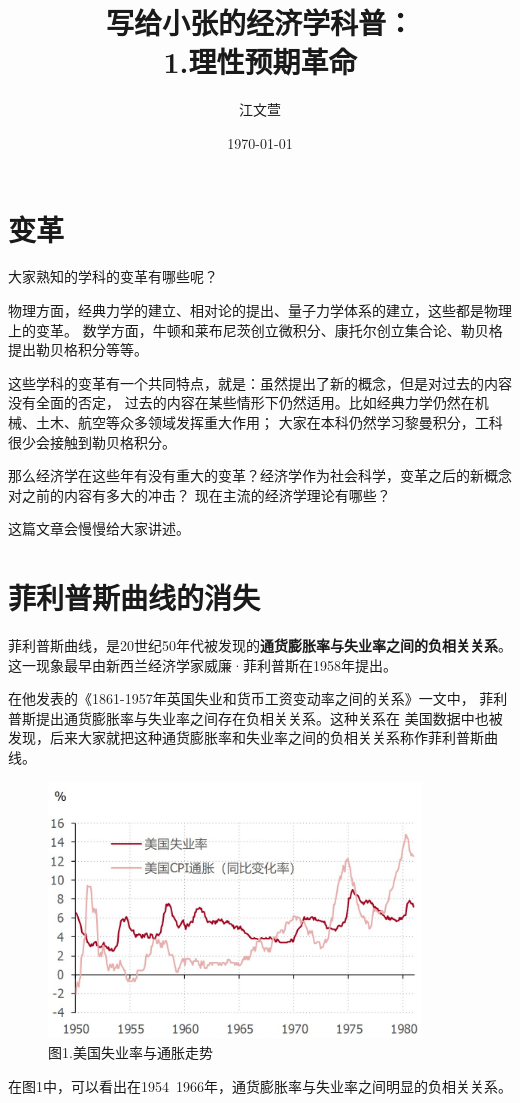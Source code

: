 \documentclass[UTF8]{ctexart}
\title{写给小张的经济学科普： \\ 1.理性预期革命}
\author{江文萱}
\date{\today}
\begin{document}
\maketitle

\section{变革}
    大家熟知的学科的变革有哪些呢？\par
    物理方面，经典力学的建立、相对论的提出、量子力学体系的建立，这些都是物理上的变革。
    数学方面，牛顿和莱布尼茨创立微积分、康托尔创立集合论、勒贝格提出勒贝格积分等等。\par
    这些学科的变革有一个共同特点，就是：虽然提出了新的概念，但是对过去的内容没有全面的否定，
    过去的内容在某些情形下仍然适用。比如经典力学仍然在机械、土木、航空等众多领域发挥重大作用；
    大家在本科仍然学习黎曼积分，工科很少会接触到勒贝格积分。\par
    那么经济学在这些年有没有重大的变革？经济学作为社会科学，变革之后的新概念对之前的内容有多大的冲击？
    现在主流的经济学理论有哪些？\par
    这篇文章会慢慢给大家讲述。

\section{菲利普斯曲线的消失}
    菲利普斯曲线，是20世纪50年代被发现的\textbf{通货膨胀率与失业率之间的负相关关系}。
    这一现象最早由新西兰经济学家威廉·菲利普斯在1958年提出。\par
	在他发表的《1861-1957年英国失业和货币工资变动率之间的关系》一文中，
	菲利普斯提出通货膨胀率与失业率之间存在负相关关系。这种关系在
    美国数据中也被发现，后来大家就把这种通货膨胀率和失业率之间的负相关关系称作菲利普斯曲线。
    \begin{figure}[H]
        \centering
        \includegraphics[width=9.9cm,height=6.8cm]{美国失业率与通胀走势.jpg}
        \caption{图1.美国失业率与通胀走势}
    \end{figure} 
    在图1中，可以看出在1954~1966年，通货膨胀率与失业率之间明显的负相关关系。
\end{document}
